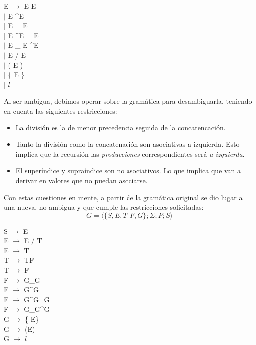 \begin{center}
 E $\rightarrow$ E E 
\\  $|$ E \textasciicircum E
\\  $|$ E \_ E
\\  $|$ E \textasciicircum E \_ E
\\  $|$ E \_ E \textasciicircum E
\\  $|$ E / E
\\  $|$ ( E )
\\  $|$ \{ E \} 
\\  $|$ $l$
\end{center}

\indent Al ser ambigua, debimos operar sobre la gramática para desambiguarla, teniendo en cuenta las siguientes restricciones:

\begin{itemize}
 \item La división es la de menor precedencia seguida de la concatencación.
  \item Tanto la división como la concatenación son asociativas a izquierda. Esto implica que la recursión las \textit{producciones} correspondientes será \textit{a izquierda}.
  \item El superíndice y supraíndice son no asociativos. Lo que implica que van a derivar en valores que no puedan asociarse.
\end{itemize}

\indent Con estas cuestiones en mente, a partir de la gramática original se dio lugar a una nueva, no ambigua y que cumple las restricciones solicitadas:\\

\begin{equation}
    G = \langle \{ S, E, T, F, G\};\Sigma;P;S \rangle
 \end{equation}

\begin{center}
 S $\rightarrow$ E
\\ E $\rightarrow$ E / T
\\ E $\rightarrow$ T
\\ T $\rightarrow$ TF
\\ T $\rightarrow$ F
\\ F $\rightarrow$ G\_G
\\ F $\rightarrow$ G\textasciicircum G
\\ F $\rightarrow$ G\textasciicircum G\_G
\\ F $\rightarrow$ G\_G\textasciicircum G
\\ G $\rightarrow$ \{ E\}
\\ G $\rightarrow$ (E)
\\ G $\rightarrow$ $l$
\end{center}

